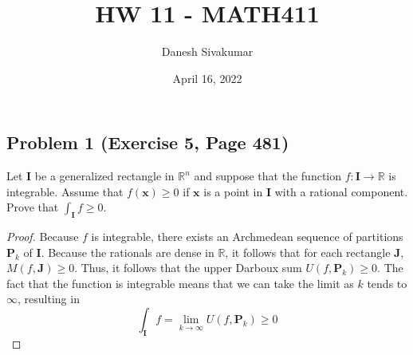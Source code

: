 \documentclass{article}
\title{HW 11 - MATH411}
\author{Danesh Sivakumar}
\date{April 16, 2022}
\begin{document}
\maketitle 


\subsection*{Problem 1 (Exercise 5, Page 481)}
Let $\textbf{I}$ be a generalized rectangle in $\mathbb{R}^n$ and suppose that the function $f \colon \textbf{I} \to \mathbb{R}$ is integrable. Assume that $f(\textbf{x}) \geq 0$ if $\textbf{x}$ is a point in $\textbf{I}$ with a rational component. Prove that $\int_{\textbf{I}} f \geq 0$.
\begin{proof}
Because $f$ is integrable, there exists an Archmedean sequence of partitions $\textbf{P}_k$ of $\textbf{I}$. Because the rationals are dense in $\mathbb{R}$, it follows that for each rectangle $\textbf{J}$, $M(f, \textbf{J}) \geq 0 $. Thus, it follows that the upper Darboux sum $U(f, \textbf{P}_k) \geq 0$. The fact that the function is integrable means that we can take the limit as $k$ tends to $\infty$, resulting in
\[ \int_{\textbf{I}} f = \lim_{k \to \infty}U(f, \textbf{P}_k) \geq 0\]
\end{proof}
\end{document}
